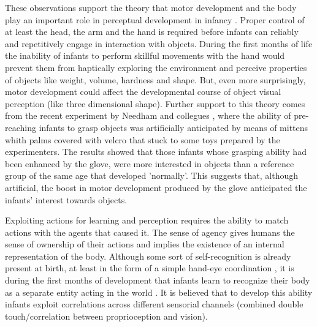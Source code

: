 These observations support the theory that motor development and the body play an important role in perceptual development in infancy \cite{bushnell93motor}. Proper control of at least the head, the arm and the hand is required before infants can reliably and repetitively engage in interaction with objects. During the first months of life the inability of infants to perform skillful movements with the hand would prevent them from haptically exploring the environment and perceive properties of objects like weight, volume, hardness and shape. But, even more surprisingly, motor development could affect the developmental course of object visual perception (like three dimensional shape).
Further support to this theory comes from the recent experiment by Needham and collegues \cite{Needham02apick-me-up}, where the ability of pre-reaching infants to grasp objects was artificially anticipated by means of mittens whith palms covered with velcro that stuck to some toys prepared by the experimenters. The results showed that those infants whose grasping ability had been enhanced by the glove, were more interested in objects than a reference group of the same age that developed 'normally'. This suggests that, although artificial, the boost in motor development produced by the glove anticipated the infants' interest towards objects.

Exploiting actions for learning and perception requires the ability to match actions with the agents that caused it. The sense of agency \cite{jeannerod02mechanism} gives humans the sense of ownership of their actions and implies the existence of an internal representation of the body. Although some sort of self-recognition is already present at birth, at least in the form of a simple hand-eye coordination \cite{meer95thefunctional}, it is during the first months of development that infants learn to recognize their body as a separate entity acting in the world \cite{rochat00perceived}. It is believed that to develop this ability infants exploit correlations across different sensorial channels (combined double touch/correlation between proprioception and vision). %

